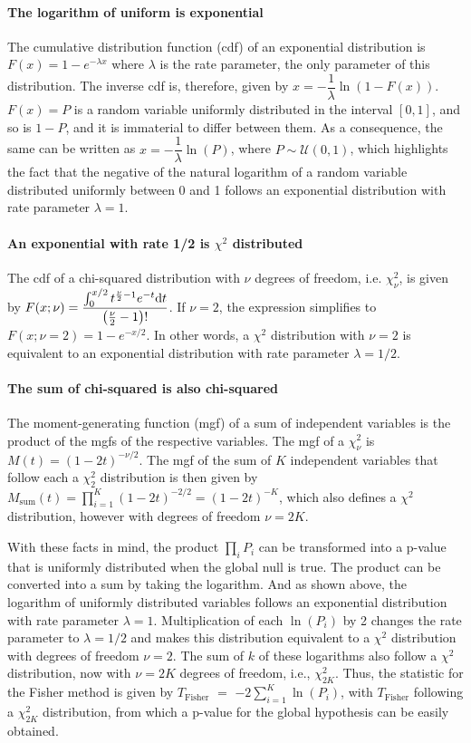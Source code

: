 \paragraph{The logarithm of uniform is exponential} The cumulative distribution function (cdf) of an exponential distribution is $F(x)=1- e^{-\lambda x}$ where $\lambda$ is the rate parameter, the only parameter of this distribution. The inverse cdf is, therefore, given by $x = -\dfrac{1}{\lambda}\ln(1-F(x))$. $F(x)=P$ is a random variable uniformly distributed in the interval $[0, 1]$, and so is $1-P$, and it is immaterial to differ between them. As a consequence, the same can be written as $x = -\dfrac{1}{\lambda}\ln(P)$, where $P \sim \mathcal{U}(0,1)$, which highlights the fact that the negative of the natural logarithm of a random variable distributed uniformly between 0 and 1 follows an exponential distribution with rate parameter $\lambda=1$.

\paragraph{An exponential with rate 1/2 is $\chi^2$ distributed} The cdf of a chi-squared distribution with $\nu$ degrees of freedom, i.e. $\chi^{2}_{\nu}$, is given by $F(x; \nu) = \dfrac{\int_{0}^{x/2} t^{\frac{\nu}{2}-1}e^{-t}{\rm d}t}{\left(\frac{\nu}{2}-1\right)!}$. If $\nu=2$, the expression simplifies to $F(x; \nu=2) = 1-e^{-x/2}$. In other words, a $\chi^{2}$ distribution with $\nu=2$ is equivalent to an exponential distribution with rate parameter $\lambda=1/2$.

\paragraph{The sum of chi-squared is also chi-squared} The moment-generating function (mgf) of a sum of independent variables is the product of the mgfs of the respective variables. The mgf of a $\chi^{2}_{\nu}$ is $M(t) = (1-2t)^{-\nu/2}$. The mgf of the sum of $K$ independent variables that follow each a $\chi^{2}_{2}$ distribution is then given by $M_{\text{sum}}(t) = \prod_{i=1}^{K} (1-2t)^{-2/2} = (1-2t)^{-K}$, which also defines a $\chi^{2}$ distribution, however with degrees of freedom $\nu=2K$.

With these facts in mind, the product $\prod_{i} P_{i}$ can be transformed into a p-value that is uniformly distributed when the global null is true. The product can be converted into a sum by taking the logarithm. And as shown above, the logarithm of uniformly distributed variables follows an exponential distribution with rate parameter $\lambda=1$. Multiplication of each $\ln(P_{i})$ by 2 changes the rate parameter to $\lambda=1/2$ and makes this distribution equivalent to a $\chi^{2}$ distribution with degrees of freedom $\nu=2$. The sum of $k$ of these logarithms also follow a $\chi^2$ distribution, now with $\nu=2K$ degrees of freedom, i.e., $\chi^{2}_{2K}$. Thus, the statistic for the Fisher method is given by $T_{\text{Fisher}}$ $=$ $-2 \sum_{i=1}^{K} \ln(P_{i})$, with $T_{\text{Fisher}}$ following a $\chi^{2}_{2K}$ distribution, from which a p-value for the global hypothesis can be easily obtained.

